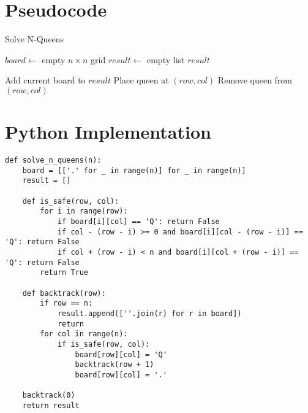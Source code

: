 \documentclass[14pt]{extarticle}
\begin{document}
\section{Pseudocode}
\begin{algorithm}
\caption{Solve N-Queens}
\begin{algorithmic}[1]
    \State $board \gets$ empty $n \times n$ grid
    \State $result \gets$ empty list
    \State {}
    \State \Return $result$
\EndProcedure

        \State Add current board to $result$
        \State \Return
    \EndIf
            \State Place queen at $(row, col)$
            \State {}
            \State Remove queen from $(row, col)$
        \EndIf
    \EndFor
\EndProcedure
\end{algorithmic}
\end{algorithm}

\section{Python Implementation}
\begin{lstlisting}[style=python, caption={N-Queens in Python}]
def solve_n_queens(n):
    board = [['.' for _ in range(n)] for _ in range(n)]
    result = []

    def is_safe(row, col):
        for i in range(row):
            if board[i][col] == 'Q': return False
            if col - (row - i) >= 0 and board[i][col - (row - i)] == 'Q': return False
            if col + (row - i) < n and board[i][col + (row - i)] == 'Q': return False
        return True

    def backtrack(row):
        if row == n:
            result.append([''.join(r) for r in board])
            return
        for col in range(n):
            if is_safe(row, col):
                board[row][col] = 'Q'
                backtrack(row + 1)
                board[row][col] = '.'

    backtrack(0)
    return result
\end{lstlisting}

\newpage
\end{document}
